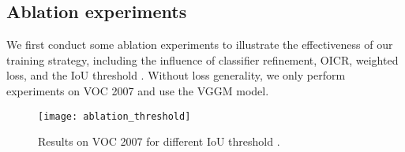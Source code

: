 \documentclass[10pt,twocolumn,letterpaper]{article}
\def\methodname{OICR}
\begin{document}
\subsection{Ablation experiments}
\label{sec:abl_exp}

We first conduct some ablation experiments to illustrate the effectiveness of our training strategy, including the influence of classifier refinement, \methodname, weighted loss, and the IoU threshold .
Without loss generality, we only perform experiments on VOC 2007 and use the VGGM model.


\begin{figure}[t]
\begin{center}
   \texttt{[image: ablation\_threshold]}
\end{center}
   \caption{Results on VOC 2007 for different IoU threshold .}
\label{fig:ablation_threshold}
\end{figure}
\end{document}
